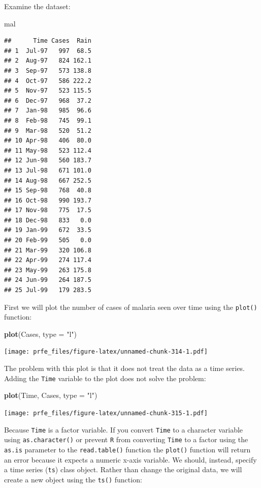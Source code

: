 \documentclass[12pt,a4paper]{book}
\newenvironment{Shaded}{\begin{snugshade}}{\end{snugshade}}
\newcommand{\KeywordTok}[1]{\textcolor[rgb]{0.13,0.29,0.53}{\textbf{#1}}}
\newcommand{\DataTypeTok}[1]{\textcolor[rgb]{0.13,0.29,0.53}{#1}}
\newcommand{\StringTok}[1]{\textcolor[rgb]{0.31,0.60,0.02}{#1}}
\newcommand{\NormalTok}[1]{#1}
\theoremstyle{definition}
\theoremstyle{definition}
\theoremstyle{definition}
\theoremstyle{remark}
\begin{document}
Examine the dataset:

\begin{Shaded}
\begin{Highlighting}[]
\NormalTok{mal}
\end{Highlighting}
\end{Shaded}

\begin{verbatim}
##      Time Cases  Rain
## 1  Jul-97   997  68.5
## 2  Aug-97   824 162.1
## 3  Sep-97   573 138.8
## 4  Oct-97   586 222.2
## 5  Nov-97   523 115.5
## 6  Dec-97   968  37.2
## 7  Jan-98   985  96.6
## 8  Feb-98   745  99.1
## 9  Mar-98   520  51.2
## 10 Apr-98   406  80.0
## 11 May-98   523 112.4
## 12 Jun-98   560 183.7
## 13 Jul-98   671 101.0
## 14 Aug-98   667 252.5
## 15 Sep-98   768  40.8
## 16 Oct-98   990 193.7
## 17 Nov-98   775  17.5
## 18 Dec-98   833   0.0
## 19 Jan-99   672  33.5
## 20 Feb-99   505   0.0
## 21 Mar-99   320 106.8
## 22 Apr-99   274 117.4
## 23 May-99   263 175.8
## 24 Jun-99   264 187.5
## 25 Jul-99   179 283.5
\end{verbatim}

First we will plot the number of cases of malaria seen over time using
the \texttt{plot()} function:

\begin{Shaded}
\begin{Highlighting}[]
\KeywordTok{plot}\NormalTok{(Cases, }\DataTypeTok{type =} \StringTok{"l"}\NormalTok{)}
\end{Highlighting}
\end{Shaded}

\texttt{[image: prfe\_files/figure-latex/unnamed-chunk-314-1.pdf]}

The problem with this plot is that it does not treat the data as a time
series. Adding the \texttt{Time} variable to the plot does not solve the
problem:

\begin{Shaded}
\begin{Highlighting}[]
\KeywordTok{plot}\NormalTok{(Time, Cases, }\DataTypeTok{type =} \StringTok{"l"}\NormalTok{)}
\end{Highlighting}
\end{Shaded}

\texttt{[image: prfe\_files/figure-latex/unnamed-chunk-315-1.pdf]}

Because \texttt{Time} is a factor variable. If you convert \texttt{Time}
to a character variable using \texttt{as.character()} or prevent
\texttt{R} from converting \texttt{Time} to a factor using the
\texttt{as.is} parameter to the \texttt{read.table()} function the
\texttt{plot()} function will return an error because it expects a
numeric x-axis variable. We should, instead, specify a time series
(\texttt{ts}) class object. Rather than change the original data, we
will create a new object using the \texttt{ts()} function:
\end{document}
